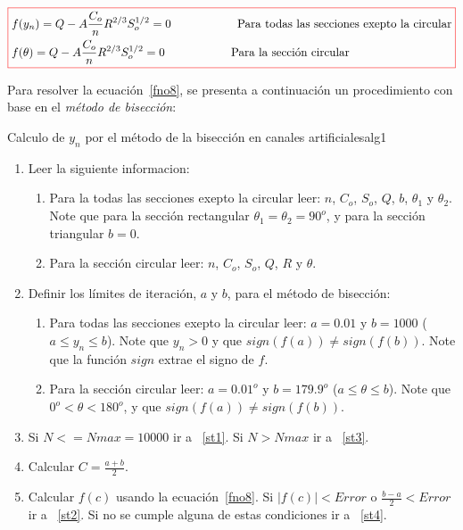 \documentclass[11pt, oneside]{article}
\begin{document}
\begin{equation}
\color{red}\boxed{\color{black}
\begin{split}
& f(y_n) = Q - A\frac{C_o }{n} R^{2/3} S_o^{1/2} = 0 \hspace{2cm} \text{Para todas las secciones exepto la circular}\\
& f(\theta) = Q - A\frac{C_o }{n} R^{2/3} S_o^{1/2} = 0 \hspace{2cm} \text{Para la secci\'on circular}\\
\end{split}
}
\label{fno8}
\end{equation}

Para resolver la ecuaci\'on~\ref{fno8}, se presenta a continuaci\'on un procedimiento con base en el \emph{m\'etodo de bisecci\'on}:
\begin{alg}{Calculo de $y_n$ por el m\'etodo de la bisecci\'on en canales artificiales}{alg1}
\begin{enumerate}
\item Leer la siguiente informacion:

\begin{enumerate}
\item Para la todas las secciones exepto la circular leer: $n$, $C_o$, $S_o$, $Q$, $b$, $\theta_1$ y $\theta_2$. Note que para la secci\'on rectangular $\theta_1 = \theta_2 = 90^o$, y para la secci\'on triangular $b=0$.
\item Para la secci\'on circular leer: $n$, $C_o$, $S_o$, $Q$, $R$ y $\theta$.
\end{enumerate}

\item Definir los l\'imites de iteraci\'on, $a$ y $b$, para el m\'etodo de bisecci\'on:
\begin{enumerate}
\item Para todas las secciones exepto la circular leer: $a = 0.01$ y $b=1000$ ($a \le y_n \le b$). Note que $y_n > 0$ y que $sign(f(a)) \neq sign(f(b)) $. Note que la funci\'on $sign$ extrae el signo de $f$.
\item Para la secci\'on circular leer: $a=0.01^o$ y $b=179.9^o$ ($a \le \theta \le b$). Note que $ 0^o < \theta < 180^o $, y que $sign(f(a)) \neq sign(f(b)) $. 
\end{enumerate}

\item \label{st5} Si $N <= Nmax=10000$ ir a ~\ref{st1}. Si $N > Nmax$ ir a ~\ref{st3}.  
\item \label{st1} Calcular $C = \frac{a+b}{2}$.
\item Calcular $f(c)$ usando la ecuaci\'on~\ref{fno8}. Si $|f(c)|< Error$ o $\frac{b-a}{2} < Error$ ir a ~\ref{st2}. Si no se cumple alguna de estas  condiciones ir a ~\ref{st4}.


\end{enumerate}
\end{alg}
\end{document}
